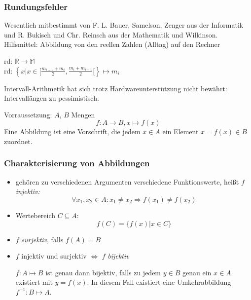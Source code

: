 \subsubsection{Rundungsfehler}

Wesentlich mitbestimmt von F. L. Bauer, Samelson, Zenger aus der Informatik und R. Bukisch und Chr. Reinsch aus der Mathematik und Wilkinson.\\
Hilfsmittel: Abbildung von den reellen Zahlen (Alltag) auf den Rechner

\begin{definition}
rd: $\mathbb{R}\rightarrow\mathbb{M}$\\
rd: $\left\{x|x \in [\frac{m_{i-1}+m_i}{2},\frac{m_{i}+m_{i+1}}{2}[\right\} \mapsto m_i$
\end{definition}

\begin{note}
Intervall-Arithmetik hat sich trotz Hardwareunterstützung nicht bewährt: Intervallängen zu pessimistisch.
\end{note}

\begin{definition}[Abbildung]
Vorraussetzung: $A$, $B$ Mengen
\begin{equation}f: A \rightarrow B, x \mapsto f(x)\end{equation}
Eine Abbildung ist eine Vorschrift, die jedem $x \in A$ ein Element $x=f(x) \in B$ zuordnet.
\end{definition}

\subsubsection*{Charakterisierung von Abbildungen}
\begin{itemize}
 \item gehören zu verschiedenen Argumenten verschiedene Funktionswerte, heißt $f$ \emph{injektiv:}
\[\forall x_1,x_2 \in A: x_1 \neq x_2 \Rightarrow f(x_1) \neq f(x_2)\]
 \item Wertebereich $C \subseteq A$:
\[ f(C) = \{f(x)|x\in C\} \]
 \item $f$ \emph{surjektiv}, falls $f(A)=B$
 \item $f$ injektiv und surjektiv $\Leftrightarrow$ $f$ \emph{bijektiv}

$f: A \mapsto B$ ist genau dann bijektiv, falls zu jedem $y \in B$ genau ein $x \in A $ existiert mit $y=f(x)$. In diesem Fall existiert eine Umkehrabbildung $f^{-1}: B \mapsto A$.
\end{itemize}
